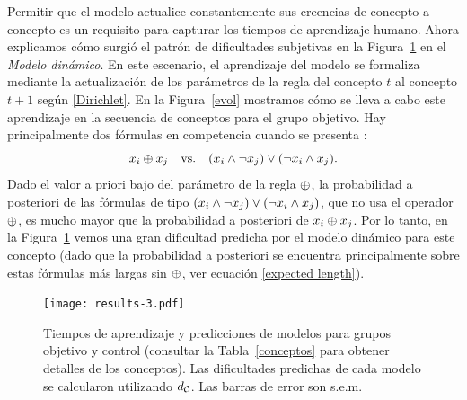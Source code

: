Permitir que el modelo actualice constantemente sus creencias de concepto a concepto es un requisito para capturar los tiempos de aprendizaje humano. Ahora explicamos cómo surgió el patrón de dificultades subjetivas en la Figura~\ref{results} en el \textit{Modelo dinámico}. En este escenario, el aprendizaje del modelo se formaliza mediante la actualización de los parámetros de la regla del concepto $ t $ al concepto $ t + 1 $ según \eqref {Dirichlet}. En la Figura~\ref{evol} mostramos cómo se lleva a cabo este aprendizaje en la secuencia de conceptos para el grupo objetivo. Hay principalmente dos fórmulas en competencia cuando se presenta \targetb: 
$$
x_{i} \oplus x_{j} \mbox{\quad vs.\quad} (x_{i} \wedge \neg x_{j}) \vee (\neg x_{i} \wedge x_{j}).
$$ 
Dado el valor a priori bajo del parámetro de la regla $ \oplus $, la probabilidad a posteriori de las fórmulas de tipo $ (x_{i} \wedge \neg x_{j}) \vee (\neg x_{i} \wedge x_{j}) $, que no usa el operador $ \oplus $, es mucho mayor que la probabilidad a posteriori de $ x_{i} \oplus x_{j} $. Por lo tanto, en la Figura~\ref{results} vemos una gran dificultad predicha por el modelo dinámico para este concepto (dado que la probabilidad a posteriori se encuentra principalmente sobre estas fórmulas más largas sin $ \oplus $, ver ecuación \eqref{expected length}).
\begin{figure}
      \centering
      \texttt{[image: results-3.pdf]}
      \caption{
      Tiempos de aprendizaje y predicciones de modelos para grupos objetivo y control (consultar la Tabla~\ref{conceptos} para obtener detalles de los conceptos). Las dificultades predichas de cada modelo se calcularon utilizando $ d_{\mathcal{C}} $. Las barras de error son s.e.m.
      }
      \label{results}
\end{figure}

